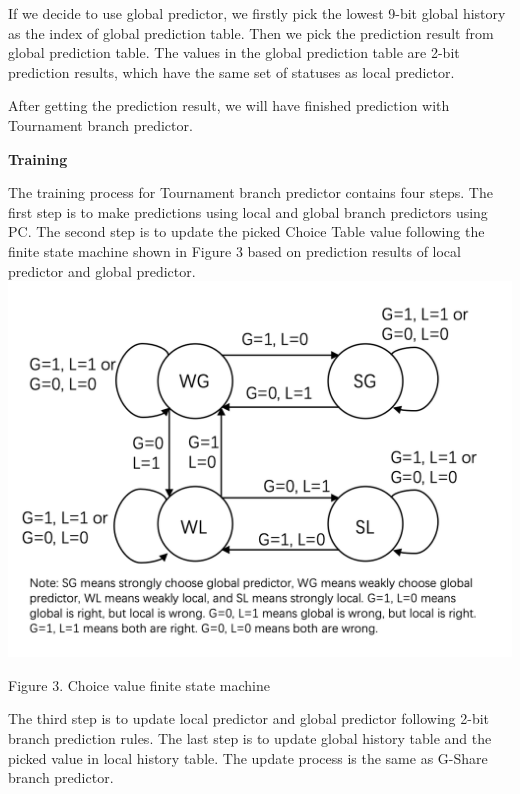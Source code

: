 \documentclass[conference]{IEEEtran}
\begin{document}
If we decide to use global predictor, we firstly pick the lowest 9-bit global history as the index of global prediction table. Then we pick the prediction result from global prediction table. 
The values in the global prediction table are 2-bit prediction results, which have the same set of statuses as local predictor. 

After getting the prediction result, we will have finished prediction with Tournament branch predictor. 

\begin{center}
  \textbf{Training}
\end{center}
The training process for Tournament branch predictor contains four steps. The first step is to make predictions using local and global branch predictors using PC. The second step is to update the 
picked Choice Table value following the finite state machine shown in Figure 3 based on prediction results of local predictor and global predictor.
\includegraphics[width=\linewidth]{choice-machine.png}
\begin{center}
  {\small Figure 3. Choice value finite state machine}
\end{center}
The third step is to update local predictor and global predictor following 2-bit branch prediction rules. The last step is to update global history table and the picked value in local history table. The 
update process is the same as G-Share branch predictor. 
\end{document}
